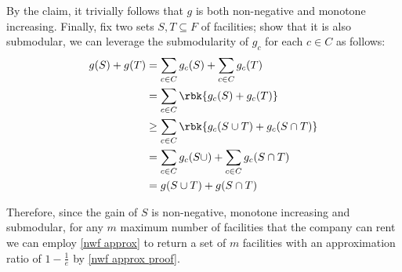 \documentclass[a4paper, 12pt]{report}
\begin{document}
{        By the claim, it trivially follows that $g$ is both non-negative and monotone increasing. Finally, fix two sets $S, T \subseteq F$ of facilities; show that it is also submodular, we can leverage the submodularity of $g_c$ for each $c \in C$ as follows:
        \begin{equation*}
            \begin{split}
                g(S) + g(T) &= \sum_{c \in C}{g_c(S)} + \sum_{c \in C}{g_c(T)} \\
                            &= \sum_{c \in C}{\rbk{g_c(S) + g_c(T)}} \\
                            &\ge \sum_{c \in C}{\rbk{g_c(S \cup T) + g_c(S \cap T)}} \\
                            &= \sum_{c \in C}{g_c(S \cup)} + \sum_{c \in C}{g_c(S \cap T)} \\
                            &= g(S \cup T) + g(S \cap T)
            \end{split}
        \end{equation*}

        Therefore, since the gain of $S$ is non-negative, monotone increasing and submodular, for any $m$ maximum number of facilities that the company can rent we can employ \cref{nwf approx} to return a set of $m$ facilities with an approximation ratio of $1 - \tfrac{1}{e}$ by \cref{nwf approx proof}.
    }

    \printbibliography %
\end{document}
